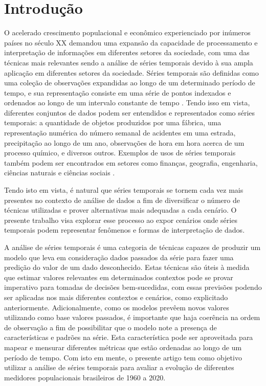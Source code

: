 \section{Introdução}

O acelerado crescimento populacional e econômico experienciado por inúmeros 
países no século XX demandou uma expansão da capacidade de processamento e 
interpretação de informações em diferentes setores da sociedade, com uma das 
técnicas mais relevantes sendo a análise de séries temporais devido à sua ampla 
aplicação em diferentes setores da sociedade. Séries temporais são definidas 
como uma coleção de observações expandidas ao longo de um determinado período 
de tempo, e sua representação consiste em uma série de pontos indexados e 
ordenados ao longo de um intervalo constante de tempo \cite{BOX:1}. Tendo isso em vista, 
diferentes conjuntos de dados podem ser entendidos e representados como séries 
temporais: a quantidade de objetos produzidos por uma fábrica, uma representação 
numérica do número semanal de acidentes em uma estrada, precipitação ao longo 
de um ano, observações de hora em hora acerca de um processo químico, e 
diversos outros. Exemplos de usos de séries temporais também podem ser encontrados 
em setores como finanças, geografia, engenharia, ciências naturais e ciências sociais \cite{WEIGEND:2}.

Tendo isto em vista, é natural que séries temporais se tornem cada vez mais presentes
no contexto de análise de dados a fim de diversificar o número de técnicas utilizadas 
e prover alternativas mais adequadas a cada cenário. O presente trabalho visa explorar 
esse processo ao expor cenários onde séries temporais podem representar fenômenos e 
formas de interpretação de dados.

A análise de séries temporais é uma categoria de técnicas capazes de produzir um 
modelo que leva em consideração dados passados da série para fazer uma predição do 
valor de um dado desconhecido. Estas técnicas são úteis à medida que estimar 
valores relevantes em determinados contextos pode se provar imperativo para 
tomadas de decisões bem-sucedidas, com essas previsões podendo ser aplicadas 
nos mais diferentes contextos e cenários, como explicitado anteriormente. 
Adicionalmente, como os modelos prevêem novos valores utilizando como base 
valores passados, é importante que haja coerência na ordem de observação a fim de 
possibilitar que o modelo note a presença de características e padrões na série. 
Esta característica pode ser aproveitada para mapear e mensurar diferentes 
métricas que estão ordenadas ao longo de um período de tempo. Com isto em mente, 
o presente artigo tem como objetivo utilizar a análise de séries temporais para 
avaliar a evolução de diferentes medidores populacionais brasileiros de 1960 a 2020.

